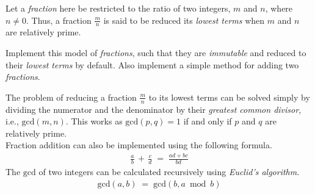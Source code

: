 

\problem Let a \textit{fraction} here be restricted to the ratio of two integers, $m$ and $n$, where $n \neq 0$. Thus, a fraction $\frac{m}{n}$ is
said to be reduced its \textit{lowest terms} when $m$ and $n$ are relatively prime.

Implement this model of \textit{fractions}, such that they are \textit{immutable} and reduced to their \textit{lowest terms} by default. Also
implement a simple method for adding two \textit{fractions}.

\solution
The problem of reducing a fraction $\frac{m}{n}$ to its lowest terms can be solved simply by dividing the numerator and the denominator by their
\textit{greatest common divisor}, i.e., $\mathrm{gcd}(m, n)$. This works as $\mathrm{gcd}(p, q) = 1$ if and only if $p$ and $q$ are relatively prime.
\\
Fraction addition can also be implemented using the following formula.
\begin{align*}
	\frac{a}{b} \,+\, \frac{c}{d} \;=\; \frac{ad + bc}{bd}
\end{align*}
The $\mathrm{gcd}$ of two integers can be calculated recursively using \textit{Euclid's algorithm}.
\begin{align*}
	\mathrm{gcd}(a, b) \;=\; \mathrm{gcd}(b, a \bmod b)
\end{align*}
